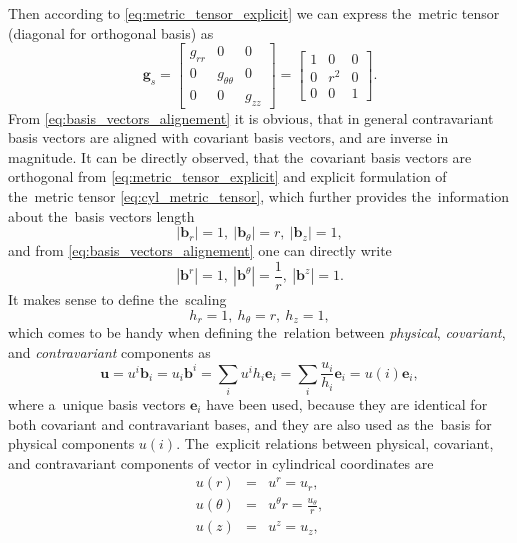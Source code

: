 \documentclass[review]{elsarticle}
\newcommand{\vect}[1]{\boldsymbol{#1}}
\newcommand{\matr}[1]{\mathbf{#1}}
\begin{document}
Then according to \eqref{eq:metric_tensor_explicit} we can express the~metric
tensor (diagonal for orthogonal basis) as
\begin{equation}
  \matr{g}_s = \begin{bmatrix}
                 g_{rr} & 0 & 0 \\
			     0 & g_{\theta\theta} & 0 \\
			     0 & 0 & g_{zz}
			   \end{bmatrix}
             = \begin{bmatrix}
                 1 & 0 & 0 \\
			     0 & r^2 & 0 \\
			     0 & 0 & 1
			   \end{bmatrix} .
  \label{eq:cyl_metric_tensor}		   
\end{equation}
From \eqref{eq:basis_vectors_alignement} it is obvious, 
that in general contravariant basis vectors are aligned with covariant basis 
vectors, and are inverse in magnitude.
It can be directly observed, that the~covariant basis vectors are orthogonal
from \eqref{eq:metric_tensor_explicit} and explicit formulation of 
the~metric tensor \eqref{eq:cyl_metric_tensor}, which further provides
the~information about the~basis vectors length
\begin{equation}
  |\vect{b}_r| = 1,~ |\vect{b}_\theta| = r,~ |\vect{b}_z| = 1,
  \nonumber
\end{equation} 
and from \eqref{eq:basis_vectors_alignement} one can directly write
\begin{equation}
  |\vect{b}^r| = 1,~ |\vect{b}^\theta| = \frac{1}{r},~ 
  |\vect{b}^z| = 1.
  \nonumber
\end{equation}
It makes sense to define the~scaling
\begin{equation}
  h_r = 1,~ h_\theta = r,~ h_z = 1,
  \label{eq:cyl_scaling}
\end{equation} 
which comes to be handy when defining the~relation between 
\textit{physical}, \textit{covariant}, and \textit{contravariant} components as
\begin{equation}
  \vect{u} = u^i \vect{b}_i = u_i \vect{b}^i = \sum_i u^i h_i \vect{e}_i
  = \sum_i \frac{u_i}{h_i} \vect{e}_i = u(i) \vect{e}_i,
  \label{eq:cyl_components}
\end{equation}
where a~unique basis vectors $\vect{e}_i$ have been used, because they are 
identical for both covariant and contravariant bases, and they are also used
as the~basis for physical components $u(i)$.
The~explicit relations between physical, covariant, and contravariant components
of vector in cylindrical coordinates are
\begin{eqnarray}
  u(r) &=& u^r = u_r , \nonumber\\
  u(\theta) &=& u^\theta r = \frac{u_\theta}{r} , 
  \nonumber\\
  u(z) &=& u^z = u_z , 
  \label{eq:cyl_physical_components}
\end{eqnarray}
\end{document}
